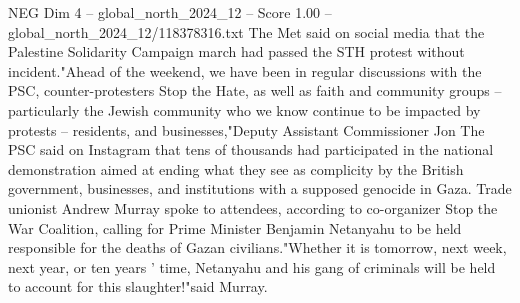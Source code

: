 \begin{textsample}{NEG Dim 4 – global\_north\_2024\_12 – Score 1.00 – global\_north\_2024\_12/118378316.txt}
The Met said on social media that the Palestine Solidarity Campaign march had passed the STH protest without incident."Ahead of the weekend, we have been in regular discussions with the PSC, counter-protesters Stop the Hate, as well as faith and community groups -- particularly the Jewish community who we know continue to be impacted by protests -- residents, and businesses,"Deputy Assistant Commissioner Jon The PSC said on Instagram that tens of thousands had participated in the national demonstration aimed at ending what they see as complicity by the British government, businesses, and institutions with a supposed genocide in Gaza.
Trade unionist Andrew Murray spoke to attendees, according to co-organizer Stop the War Coalition, calling for Prime Minister Benjamin Netanyahu to be held responsible for the deaths of Gazan civilians."Whether it is tomorrow, next week, next year, or ten years ' time, Netanyahu and his gang of criminals will be held to account for this slaughter!"said Murray.

\end{textsample}
